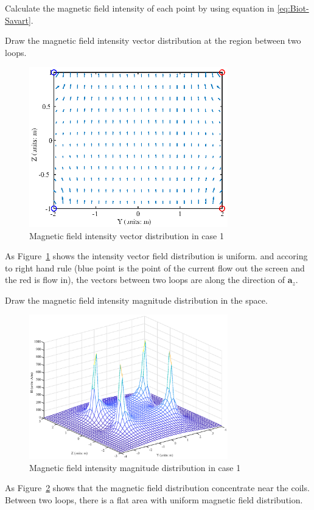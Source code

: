 \documentclass[10pt, journal, final]{IEEEtran}
\begin{document}
Calculate the magnetic field intensity of each point by using equation in \ref{eq:Biot-Savart}.


Draw the magnetic field intensity vector distribution at the region between two loops.


\begin{figure}[htbp]
    \centering
    \includegraphics[width = 3.4in]{figures/work1.1.eps}
    \caption{Magnetic field intensity vector distribution in case 1}
    \label{fig:1.1}
\end{figure}
As Figure~\ref{fig:1.1} shows the intensity vector field distribution is uniform. and accoring to right hand rule 
(blue point is the point of the current flow out the screen and the red is flow in),
the vectors between two loops are along the direction of $\mathbf{a}_z$.\\\par
Draw the magnetic field intensity magnitude distribution in the space.


\begin{figure}[htbp]
    \centering
    \includegraphics[width = 3.4in]{figures/work1.2.eps}
    \caption{Magnetic field intensity magnitude distribution in case 1}
    \label{fig:1.2}
\end{figure} 
As Figure~\ref{fig:1.2} shows that the magnetic field distribution concentrate near the coils.
Between two loops, there is a flat area with uniform magnetic field distribution.\\\par
\end{document}
